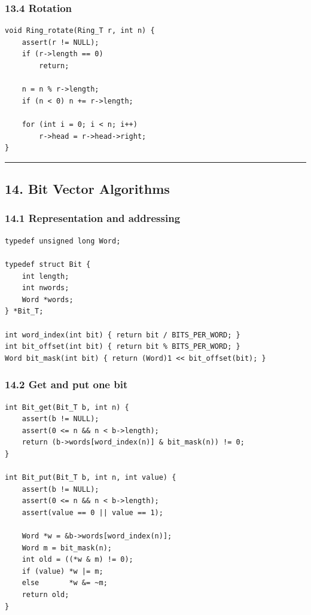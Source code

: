 \documentclass[11pt]{article}
\begin{document}
\subsubsection{13.4 Rotation}\label{rotation}

\begin{verbatim}
void Ring_rotate(Ring_T r, int n) {
    assert(r != NULL);
    if (r->length == 0)
        return;

    n = n % r->length;
    if (n < 0) n += r->length;

    for (int i = 0; i < n; i++)
        r->head = r->head->right;
}
\end{verbatim}

\begin{center}\rule{0.5\linewidth}{0.5pt}\end{center}

\subsection{14. Bit Vector Algorithms}\label{bit-vector-algorithms}

\subsubsection{14.1 Representation and addressing}\label{representation-and-addressing}

\begin{verbatim}
typedef unsigned long Word;

typedef struct Bit {
    int length;
    int nwords;
    Word *words;
} *Bit_T;

int word_index(int bit) { return bit / BITS_PER_WORD; }
int bit_offset(int bit) { return bit % BITS_PER_WORD; }
Word bit_mask(int bit) { return (Word)1 << bit_offset(bit); }
\end{verbatim}

\subsubsection{14.2 Get and put one bit}\label{get-and-put-one-bit}

\begin{verbatim}
int Bit_get(Bit_T b, int n) {
    assert(b != NULL);
    assert(0 <= n && n < b->length);
    return (b->words[word_index(n)] & bit_mask(n)) != 0;
}

int Bit_put(Bit_T b, int n, int value) {
    assert(b != NULL);
    assert(0 <= n && n < b->length);
    assert(value == 0 || value == 1);

    Word *w = &b->words[word_index(n)];
    Word m = bit_mask(n);
    int old = ((*w & m) != 0);
    if (value) *w |= m;
    else       *w &= ~m;
    return old;
}
\end{verbatim}
\end{document}
